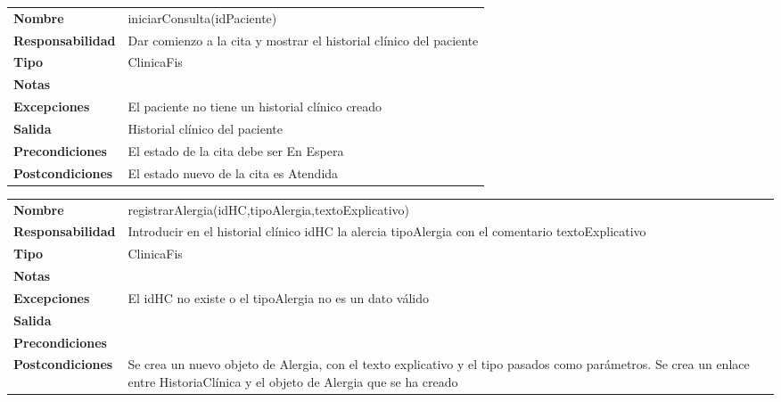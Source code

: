 \documentclass[11pt]{article}
\begin{document}
\begin{table}[htbp]
	  \begin{tabularx}{\textwidth}{l|l}
    \textbf{Nombre}        & iniciarConsulta(idPaciente) \\ 
    \textbf{Responsabilidad}  & Dar comienzo a la cita y mostrar el historial clínico del paciente \\ 
    \textbf{Tipo}        &  ClinicaFis\\ 
    \textbf{Notas}        &  \\ 
    \textbf{Excepciones}    & El paciente no tiene un historial clínico creado \\ 
    \textbf{Salida}        & Historial clínico del paciente \\ 
    \textbf{Precondiciones}    & El estado de la cita debe ser En Espera \\ 
    \textbf{Postcondiciones}  &  El estado nuevo de la cita es Atendida\\ 
  \end{tabularx}

\end{table}


\begin{table}[htbp]
	  \begin{tabularx}{\textwidth}{l|l}
    \textbf{Nombre}        & registrarAlergia(idHC,tipoAlergia,textoExplicativo) \\ 
    \textbf{Responsabilidad}  & Introducir en el historial clínico idHC la alercia tipoAlergia con el comentario textoExplicativo \\ 
    \textbf{Tipo}        & ClinicaFis \\ 
    \textbf{Notas}        &  \\ 
    \textbf{Excepciones}    & El idHC no existe o el tipoAlergia no es un dato válido \\ 
    \textbf{Salida}        &  \\ 
    \textbf{Precondiciones}    &  \\ 
    \textbf{Postcondiciones}  &  Se crea un nuevo objeto de Alergia, con el texto explicativo y el tipo pasados como parámetros.
    Se crea un enlace  entre HistoriaClínica y el objeto de Alergia que se ha creado \\ 
  \end{tabularx}

\end{table}
\end{document}
